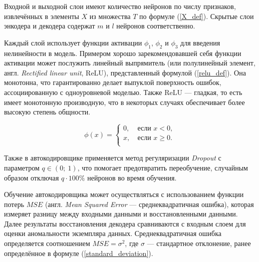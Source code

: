 Входной и выходной слои имеют количество нейронов по числу признаков, извлечённых в элементы $X$ из множества $T$ по формуле (\ref{X_def}). Скрытые слои энкодера и декодера содержат $m$ и $l$ нейронов соответственно.

Каждый слой использует функции активации $\phi_1$, $\phi_2$ и $\phi_3$ для введения нелинейности в модель. Примером хорошо зарекомендовавшей себя функции активации может послужить линейный выпрямитель (или полулинейный элемент, англ. \textit{Rectified linear unit}, ReLU), представленный формулой (\ref{relu_def}). Она монотонна, что гарантированно делает выпуклой поверхность ошибок, ассоциированную с одноуровневой моделью. Также ReLU --- гладкая, то есть имеет монотонную производную, что в некоторых случаях обеспечивает более высокую степень общности.

\begin{equation}\label{relu_def}
    \phi(x) = 
    \begin{cases}
        0, &\ \text{если } x < 0, \\
        x, &\ \text{если } x \ge 0. \\ 
    \end{cases}
\end{equation}

Также в автокодировщике применяется метод регуляризации \textit{Dropout} с параметром $q \in (0;\ 1)$, что помогает предотвратить переобучение, случайным образом отключая $q \cdot 100\%$ нейронов во время обучения. 

Обучение автокодировщика может осуществляться с использованием функции потерь $MSE$ (англ. \textit{Mean Squared Error} --- среднеквадратичная ошибка), которая измеряет разницу между входными данными и восстановленными данными. Далее результаты восстановления декодера сравниваются с входным слоем для оценки аномальности экземпляра данных. Среднеквадратичная ошибка определяется соотношением $MSE = \sigma^2$, где $\sigma$ --- стандартное отклонение, ранее определённое в формуле (\ref{standard_deviation}).

